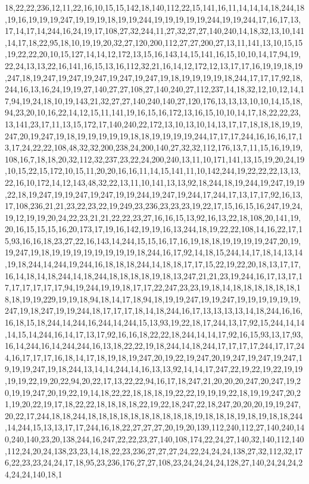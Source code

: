 18,22,22,236,12,11,22,16,10,15,15,142,18,140,112,22,15,141,16,11,14,14,14,18,244,18,19,16,19,19,19,247,19,19,19,18,19,19,244,19,19,19,19,19,244,19,19,244,17,16,17,13,17,14,17,14,244,16,24,19,17,108,27,32,244,11,27,32,27,27,140,240,14,18,32,13,10,141,14,17,18,22,95,18,10,19,19,20,32,27,120,200,112,27,27,200,27,13,11,141,13,10,15,15,19,22,22,20,10,15,127,14,14,12,172,13,15,16,143,14,15,141,16,15,10,10,14,17,94,19,22,24,13,13,22,16,141,16,15,13,16,112,32,21,16,14,12,172,12,13,17,17,16,19,19,18,19,247,18,19,247,19,247,19,247,19,247,19,247,19,18,19,19,19,19,18,244,17,17,17,92,18,244,16,13,16,24,19,19,27,140,27,27,108,27,140,240,27,112,237,14,18,32,12,10,12,14,17,94,19,24,18,10,19,143,21,32,27,27,140,240,140,27,120,176,13,13,13,10,10,14,15,18,94,23,20,10,16,22,14,12,15,11,141,19,16,15,16,172,13,16,15,10,10,14,17,18,22,22,23,13,141,23,17,11,13,15,172,17,140,240,22,172,13,10,13,10,14,13,17,17,18,18,18,19,19,247,20,19,247,19,18,19,19,19,19,19,18,18,19,19,19,19,244,17,17,17,244,16,16,16,17,13,17,24,22,22,108,48,32,32,200,238,24,200,140,27,32,32,112,176,13,7,11,15,16,19,19,108,16,7,18,18,20,32,112,32,237,23,22,24,200,240,13,11,10,171,141,13,15,19,20,24,19,10,15,22,15,172,10,15,11,20,20,16,16,11,14,15,141,11,10,142,244,19,22,22,22,13,13,22,16,10,172,14,12,143,48,32,22,13,11,10,141,13,13,92,18,244,18,19,244,19,247,19,19,22,18,19,247,19,19,247,19,247,19,19,244,19,247,19,244,17,244,17,13,17,17,92,16,13,17,108,236,21,21,23,22,23,22,19,249,23,236,23,23,23,19,22,17,15,16,15,16,247,19,24,19,12,19,19,20,24,22,23,21,21,22,22,23,27,16,16,15,13,92,16,13,22,18,108,20,141,19,20,16,15,15,15,16,20,173,17,19,16,142,19,19,16,13,244,18,19,22,22,108,14,16,22,17,15,93,16,16,18,23,27,22,16,143,14,244,15,15,16,17,16,19,18,18,19,19,19,19,247,20,19,19,247,19,18,19,19,19,19,19,19,19,19,18,244,16,17,92,14,18,15,244,14,17,18,14,13,14,19,18,244,14,244,19,244,16,18,18,18,244,14,18,18,17,17,15,22,19,22,20,18,13,17,17,16,14,18,14,18,244,14,18,244,18,18,18,18,19,18,13,247,21,21,23,19,244,16,17,13,17,17,17,17,17,17,17,94,19,244,19,19,18,17,17,22,247,23,23,19,18,14,18,18,18,18,18,18,18,18,19,19,229,19,19,18,94,18,14,17,18,94,18,19,19,247,19,19,247,19,19,19,19,19,19,247,19,18,247,19,19,244,18,17,17,17,18,14,18,244,16,17,13,13,13,13,14,18,244,16,16,16,18,15,18,244,14,244,16,244,14,244,15,13,93,19,22,18,17,244,13,17,92,15,244,14,14,14,15,14,244,16,14,17,13,17,92,16,16,18,22,22,18,244,14,14,17,92,16,15,93,13,17,93,16,14,244,16,14,244,244,16,13,18,22,22,19,18,244,14,18,244,17,17,17,17,244,17,17,244,16,17,17,17,16,18,14,17,18,19,18,19,247,20,19,22,19,247,20,19,247,19,247,19,247,19,19,19,247,19,18,244,13,14,14,244,14,16,13,13,92,14,14,17,247,22,19,22,19,22,19,19,19,19,22,19,20,22,94,20,22,17,13,22,22,94,16,17,18,247,21,20,20,20,247,20,247,19,20,19,19,247,20,19,22,19,14,18,22,22,18,18,18,19,22,22,19,19,19,22,18,19,19,247,20,21,19,20,22,19,17,18,22,22,18,18,18,18,22,19,22,18,247,22,18,247,20,20,20,19,19,247,20,22,17,244,18,18,244,18,18,18,18,18,18,18,18,18,18,19,18,18,18,19,18,19,18,18,244,14,244,15,13,13,17,17,244,16,18,22,27,27,27,20,19,20,139,112,240,112,27,140,240,140,240,140,23,20,138,244,16,247,22,22,23,27,140,108,174,22,24,27,140,32,140,112,140,112,24,20,24,138,23,23,14,18,22,23,236,27,27,27,24,22,24,24,24,138,27,32,112,32,176,22,23,23,24,24,17,18,95,23,236,176,27,27,108,23,24,24,24,24,128,27,140,24,24,24,24,24,24,140,18,1